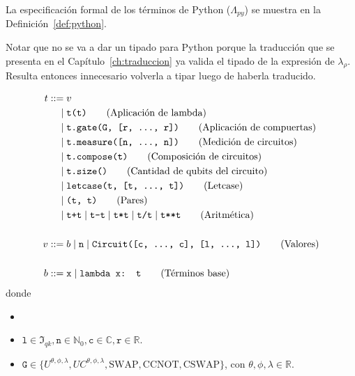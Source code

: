 La especificación formal de los términos de Python ($\Lambda_\textit{py}$) se muestra en la Definición~\ref{def:python}.

Notar que no se va a dar un tipado para Python porque la traducción que se presenta en el Capítulo~\ref{ch:traduccion} ya valida el tipado de la expresión de $\lambda_\rho$. Resulta entonces innecesario volverla a tipar luego de haberla traducido.

\begin{definicion}
\label{def:python}
\begin{align*}
t ::= &\; v\\
 \mid&\; \texttt{t(t)} \tag{Aplicación de lambda}\\
 \mid&\; \texttt{t.gate(G, [r, \dots, r])} \tag{Aplicación de compuertas}\\
 \mid&\; \texttt{t.measure([n, \dots, n])} \tag{Medición de circuitos}\\
 \mid&\; \texttt{t.compose(t)} \tag{Composición de circuitos}\\
 \mid&\; \texttt{t.size()} \tag{Cantidad de qubits del circuito}\\
 \mid&\; \texttt{letcase(t, [t, \dots, t])} \tag{Letcase}\\
 \mid&\; \texttt{(t, t)} \tag{Pares}\\
 \mid&\; \texttt{t+t} \mid \texttt{t-t} \mid \texttt{t*t} \mid \texttt{t/t} \mid \texttt{t**t} \tag{Aritmética}\\\\
v ::= &\; b \mid \texttt{n} \mid \texttt{Circuit([c, \dots, c], [l, \dots, l])} \tag{Valores}\\\\
b ::= &\; \texttt{x} \mid \texttt{lambda x: t} \tag{Términos base}
\end{align*}
donde
\begin{itemize}
    \item
    \item $\texttt{l} \in \mathfrak{I}_{\textit{qk}}, \texttt{n} \in \mathbb{N}_0, \texttt{c} \in \mathbb{C}, \texttt{r} \in \mathbb{R}$.
    \item $\texttt{G} \in \{U^{\theta, \phi, \lambda}, UC^{\theta, \phi, \lambda}, \textrm{SWAP}, \textrm{CCNOT}, \textrm{CSWAP}\}$, con $\theta, \phi, \lambda \in \mathbb{R}$.
\end{itemize}
\end{definicion}

